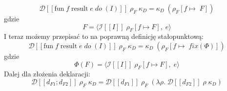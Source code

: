 \documentclass[a4paper]{article}
\begin{document}
$$
\mathcal{D}[\![ \text{fun} \; f \; \text{result} \; e \; do \; (I) ]\!] \; \rho_F \; \kappa_D = \kappa_D \; (\rho_F [ f \mapsto \; F ])
$$
gdzie
$$
F = \langle 
\mathcal{I}[\![ I ]\!] \; \rho_F [f  \mapsto F]
, \; e \rangle
$$
I teraz możemy przepisać to na poprawną definicję stałopunktową:
$$
\mathcal{D}[\![ \text{fun} \; f \; \text{result} \; e \; do \; (I) ]\!] \; \rho_F \; \kappa_D = \kappa_D \; (\rho_F [ f \mapsto \; fix(\Phi) ])
$$
gdzie
$$
\Phi(F) = \langle 
\mathcal{I}[\![ I ]\!] \; \rho_F [f  \mapsto F]
, \; e \rangle
$$
Dalej dla złożenia deklaracji:
$$
\mathcal{D}[\![ d_{F1} ; d_{F2} ]\!] \; \rho_F \; \kappa_D = 
\mathcal{D}[\![ d_{F1} ]\!] \; \rho_F \; (\lambda \rho . \;
\mathcal{D}[\![ d_{F2} ]\!] \; \rho \; \kappa_D)
$$
\end{document}
